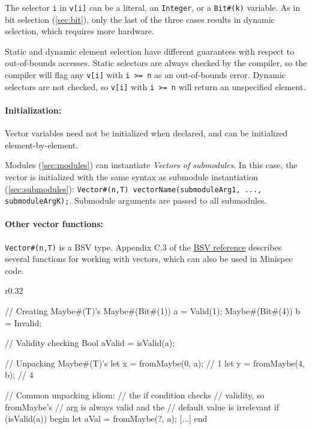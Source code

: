 The selector \verb|i| in \verb|v[i]| can be a literal, an \verb|Integer|, or a \verb|Bit#(k)| variable.
As in bit selection (\autoref{sec:bit}), only the last of the three cases results in dynamic selection,
which requires more hardware.

Static and dynamic element selection have different guarantees with respect to out-of-bounds accesses.
Static selectors are always checked by the compiler,
so the compiler will flag any \verb|v[i]| with \verb|i >= n| as an out-of-bounds error.
Dynamic selectors are not checked, so \verb|v[i]| with \verb|i >= n| will return an unspecified element.

\paragraph{Initialization:} Vector variables need not be initialized when declared,
and can be initialized element-by-element.

Modules (\autoref{sec:modules}) can instantiate \emph{Vectors of submodules}.
In this case, the vector is initialized with the same syntax as submodule instantiation (\autoref{sec:submodules}):
\verb|Vector#(n,T) vectorName(submoduleArg1, ..., submoduleArgK);|. Submodule arguments are passed to all submodules.

\paragraph{Other vector functions:} \verb|Vector#(n,T)| is a BSV type.
Appendix C.3 of the \href{http://csg.csail.mit.edu/6.S078/6_S078_2012_www/resources/reference-guide.pdf}{BSV reference}
describes several functions for working with vectors,
which can also be used in Minispec code.

\begin{wrapfigure}{r}{0.32\columnwidth}
\vspace{-4em}
\begin{mscode}
// Creating Maybe#(T)'s
Maybe#(Bit#(1)) a = Valid(1);
Maybe#(Bit#(4)) b = Invalid;

// Validity checking
Bool aValid = isValid(a);

// Unpacking Maybe#(T)'s
let x = fromMaybe(0, a); // 1
let y = fromMaybe(4, b); // 4

// Common unpacking idiom:
// the if condition checks
// validity, so fromMaybe's
// arg is always valid and the
// default value is irrelevant
if (isValid(a)) begin
  let aVal = fromMaybe(?, a);
  [...]
end
\end{mscode}
\vspace{-5em}
\end{wrapfigure}

